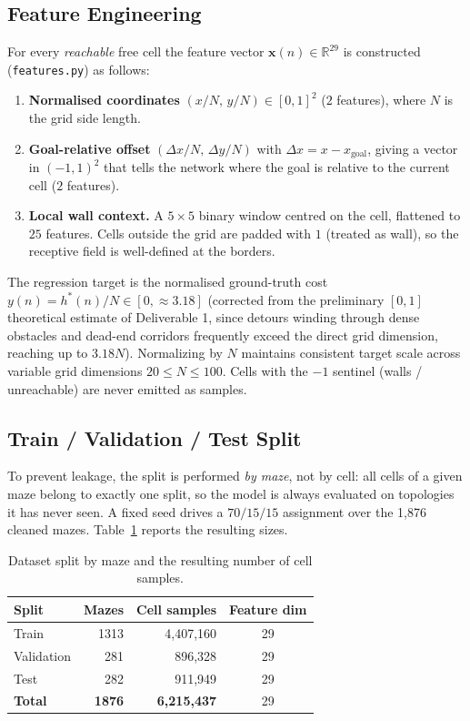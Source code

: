 \documentclass[11pt]{article}
\begin{document}
\subsection{Feature Engineering}
\label{sec:features}
For every \emph{reachable} free cell the feature vector $\mathbf{x}(n)\in\mathbb{R}^{29}$
is constructed (\texttt{features.py}) as follows:

\begin{enumerate}
  \item \textbf{Normalised coordinates} $(x/N,\,y/N)\in[0,1]^2$ ($2$ features), where
  $N$ is the grid side length.
  \item \textbf{Goal-relative offset} $(\Delta x/N,\,\Delta y/N)$ with
  $\Delta x = x - x_{\text{goal}}$, giving a vector in $(-1,1)^2$ that tells the network
  where the goal is relative to the current cell ($2$ features).
  \item \textbf{Local wall context.} A $5\times5$ binary window centred on the cell,
  flattened to $25$ features. Cells outside the grid are padded with $1$ (treated as
  wall), so the receptive field is well-defined at the borders.
\end{enumerate}

The regression target is the normalised ground-truth cost
$y(n) = h^\ast(n)/N \in [0, \approx 3.18]$ (corrected from the preliminary $[0,1]$ theoretical
estimate of Deliverable 1, since detours winding through dense obstacles and dead-end corridors
frequently exceed the direct grid dimension, reaching up to $3.18 N$). Normalizing by $N$ maintains
consistent target scale across variable grid dimensions $20 \le N \le 100$.
Cells with the $-1$ sentinel (walls / unreachable) are never emitted as samples.

\subsection{Train / Validation / Test Split}
To prevent leakage, the split is performed \emph{by maze}, not by cell: all cells of a
given maze belong to exactly one split, so the model is always evaluated on topologies it
has never seen. A fixed seed drives a $70/15/15$ assignment over the 1{,}876 cleaned
mazes. Table~\ref{tab:split} reports the resulting sizes.

\begin{table}[H]
\centering
\caption{Dataset split by maze and the resulting number of cell samples.}
\label{tab:split}
\begin{tabular}{lrrc}
\toprule
Split & Mazes & Cell samples & Feature dim \\
\midrule
Train & 1313 & 4{,}407{,}160 & 29 \\
Validation & 281 & 896{,}328 & 29 \\
Test & 282 & 911{,}949 & 29 \\
\midrule
\textbf{Total} & \textbf{1876} & \textbf{6{,}215{,}437} & 29 \\
\bottomrule
\end{tabular}
\end{table}
\end{document}
